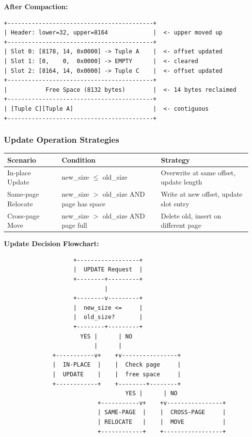 \documentclass[11pt,a4paper]{article}
\begin{document}
\textbf{After Compaction:}
\begin{lstlisting}
+------------------------------------------+
| Header: lower=32, upper=8164             |  <- upper moved up
+------------------------------------------+
| Slot 0: [8178, 14, 0x0000] -> Tuple A    |  <- offset updated
| Slot 1: [0,    0,  0x0000] -> EMPTY      |  <- cleared
| Slot 2: [8164, 14, 0x0000] -> Tuple C    |  <- offset updated
+------------------------------------------+
|           Free Space (8132 bytes)        |  <- 14 bytes reclaimed
+------------------------------------------+
| [Tuple C][Tuple A]                       |  <- contiguous
+------------------------------------------+
\end{lstlisting}

\subsubsection{Update Operation Strategies}

\begin{table}[H]
\centering
\small
\begin{tabular}{@{}p{}p{}p{}@{}}
\toprule
\textbf{Scenario} & \textbf{Condition} & \textbf{Strategy} \\
\midrule
In-place Update & new\_size $\leq$ old\_size & Overwrite at same offset, update length \\
Same-page Relocate & new\_size $>$ old\_size AND page has space & Write at new offset, update slot entry \\
Cross-page Move & new\_size $>$ old\_size AND page full & Delete old, insert on different page \\
\bottomrule
\end{tabular}
\end{table}

\textbf{Update Decision Flowchart:}
\begin{lstlisting}
                    +------------------+
                    |  UPDATE Request  |
                    +--------+---------+
                             |
                    +--------v---------+
                    |  new_size <=     |
                    |  old_size?       |
                    +--------+---------+
                      YES |      | NO
                          |      |
              +-----------v+    +v----------------+
              |  IN-PLACE  |    |  Check page     |
              |  UPDATE    |    |  free space     |
              +------------+    +--------+--------+
                                   YES |      | NO
                           +-----------v+    +v----------------+
                           | SAME-PAGE  |    |  CROSS-PAGE     |
                           | RELOCATE   |    |  MOVE           |
                           +------------+    +-----------------+
\end{lstlisting}
\end{document}
